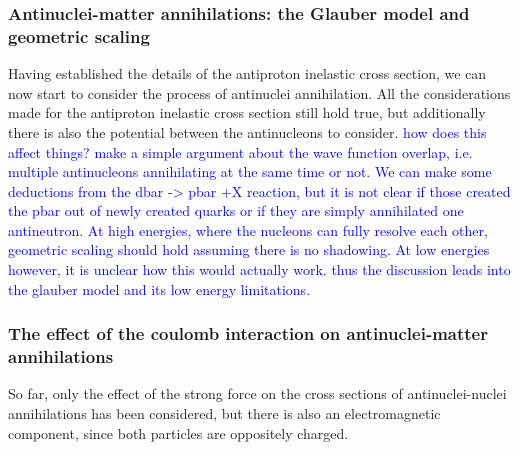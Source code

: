 \subsubsection{Antinuclei-matter annihilations: the Glauber model and geometric scaling}\label{sec:IntroGlauber}
Having established the details of the antiproton inelastic cross section, we can now start to consider the process of antinuclei annihilation. All the considerations made for the antiproton inelastic cross section still hold true, but additionally there is also the potential between the antinucleons to consider. \textcolor{blue}{how does this affect things? make a simple argument about the wave function overlap, i.e. multiple antinucleons annihilating at the same time or not. We can make some deductions from the dbar -> pbar +X reaction, but it is not clear if those created the pbar out of newly created quarks or if they are simply annihilated one antineutron. At high energies, where the nucleons can fully resolve each other, geometric scaling should hold assuming there is no shadowing. At low energies however, it is unclear how this would actually work. thus the discussion leads into the glauber model and its low energy limitations.}

\subsubsection{The effect of the coulomb interaction on antinuclei-matter annihilations}
So far, only the effect of the strong force on the cross sections of antinuclei-nuclei annihilations has been considered, but there is also an electromagnetic component, since both particles are oppositely charged. 
